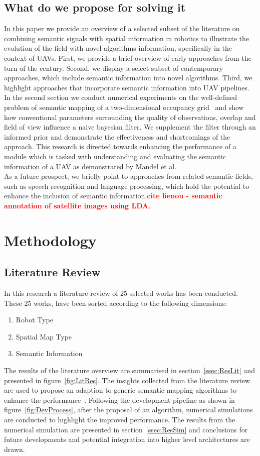 \documentclass[twocolumn,letterpaper]{IEEEAerospaceCLS}  %
\newcommand\todo[1]{\textbf{\textcolor{red}{#1}}}
\begin{document}
\subsection{What do we propose for solving it}
In this paper we provide an overview of a selected subset of the literature on combining semantic signals with spatial information in robotics to illustrate the evolution of the field with novel algorithms information, specifically in the context of UAVs. First, we provide a brief overview of early approaches from the turn of the century. Second, we display a select subset of contemporary approaches, which include semantic information into novel algorithms. Third, we highlight approaches that incorporate semantic information into UAV pipelines.\\
In the second section we conduct numerical experiments on the well-defined problem of semantic mapping of a two-dimensional occupancy grid~\cite{gonzalez_unmanned_2016} and show how conventional parameters surrounding the quality of observations, overlap and field of view influence a naive bayesian filter. We supplement the filter through an informed prior and demonstrate the effectiveness and shortcomings of the approach. This research is directed towards enhancing the performance of a module which is tasked with understanding and evaluating the semantic information of a UAV as demonstrated by Mandel et al.~\cite{mandel_towards_2020}\\
As a future prospect, we briefly point to approaches from related semantic fields, such as speech recognition and language processing, which hold the potential to enhance the inclusion of semantic information.\todo{cite lienou - semantic annotation of satellite images using LDA}.

\section{Methodology} \label{sec:Met}
\subsection{Literature Review} \label{ssec:MetLit}
In this research a literature review of $25$ selected works has been conducted. These $25$ works, have been sorted according to the following dimensions:
\begin{enumerate}
    \item Robot Type
    \item Spatial Map Type
    \item Semantic Information
\end{enumerate}
The results of the literature overview are summarised in section~\ref{ssec:ResLit} and presented in figure~\ref{fig:LitRes}. The insights collected from the literature review are used to propose an adaption to generic semantic mapping algorithms to enhance the performance~\cite{kostavelis_semantic_2015}. Following the development pipeline as shown in figure~\ref{fig:DevProcess}, after the proposal of an algorithm, numerical simulations are conducted to highlight the improved performance. The results from the numerical simulation are presented in section~\ref{ssec:ResSim} and conclusions for future developments and potential integration into higher level architectures are drawn.
\end{document}

